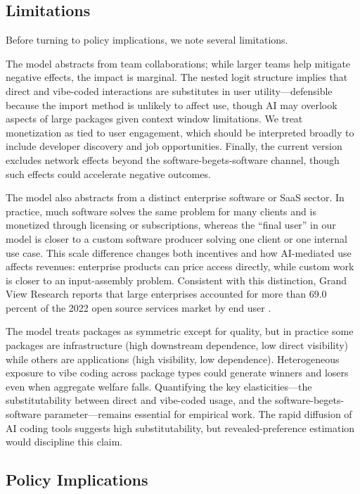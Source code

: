 \documentclass[11pt,a4paper]{article}
\theoremstyle{definition}
\theoremstyle{remark}
\begin{document}
\subsection*{Limitations}

Before turning to policy implications, we note several limitations.

The model abstracts from team collaborations; while larger teams help mitigate negative effects, the impact is marginal. The nested logit structure implies that direct and vibe-coded interactions are substitutes in user utility---defensible because the import method is unlikely to affect use, though AI may overlook aspects of large packages given context window limitations. We treat monetization as tied to user engagement, which should be interpreted broadly to include developer discovery and job opportunities. Finally, the current version excludes network effects beyond the software-begets-software channel, though such effects could accelerate negative outcomes.

The model also abstracts from a distinct enterprise software or SaaS sector. In practice, much software solves the same problem for many clients and is monetized through licensing or subscriptions, whereas the ``final user'' in our model is closer to a custom software producer solving one client or one internal use case. This scale difference changes both incentives and how AI-mediated use affects revenues: enterprise products can price access directly, while custom work is closer to an input-assembly problem. Consistent with this distinction, Grand View Research reports that large enterprises accounted for more than 69.0 percent of the 2022 open source services market by end user \citep{grand-view-research-2022-oss-services}.

The model treats packages as symmetric except for quality, but in practice some packages are infrastructure (high downstream dependence, low direct visibility) while others are applications (high visibility, low dependence). Heterogeneous exposure to vibe coding across package types could generate winners and losers even when aggregate welfare falls. Quantifying the key elasticities---the substitutability between direct and vibe-coded usage, and the software-begets-software parameter---remains essential for empirical work. The rapid diffusion of AI coding tools suggests high substitutability, but revealed-preference estimation would discipline this claim.

\subsection*{Policy Implications}
\end{document}
